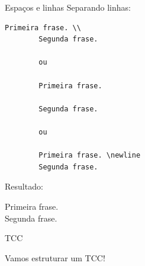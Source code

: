 \documentclass{beamer}
\begin{document}
\begin{frame}[fragile]{Espa\c{c}os e linhas}
    Separando linhas:
    \begin{lstlisting}[style=limpo]
        Primeira frase. \\
        Segunda frase.

        ou

        Primeira frase.

        Segunda frase.

        ou

        Primeira frase. \newline
        Segunda frase.
    \end{lstlisting}

    Resultado:
    \begin{center}
        Primeira frase. \\
        Segunda frase.
    \end{center}
\end{frame}

\begin{frame}{TCC}
    \begin{center}
        Vamos estruturar um TCC!
    \end{center}
\end{frame}





\end{document}
